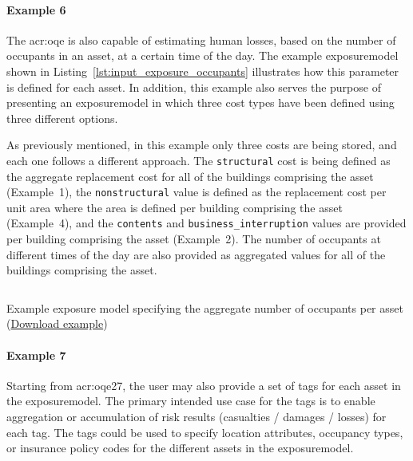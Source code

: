 \paragraph{Example 6}

The \glsdesc{acr:oqe} is also capable of estimating human losses, based on the
number of occupants in an \gls{asset}, at a certain time of the day. The example
\gls{exposuremodel} shown in Listing~\ref{lst:input_exposure_occupants} illustrates
how this parameter is defined for each \gls{asset}. In addition, this example also
serves the purpose of presenting an \gls{exposuremodel} in which three cost
types have been defined using three different options.

As previously mentioned, in this example only three costs are being stored,
and each one follows a different approach. The \Verb+structural+ cost is being
defined as the aggregate replacement cost for all of the buildings comprising
the asset (Example~1), the \Verb+nonstructural+ value is defined as the
replacement cost per unit area where the area is defined per building
comprising the \gls{asset} (Example~4), and the \Verb+contents+ and
\Verb+business_interruption+ values are provided per building comprising the
\gls{asset} (Example~2). The number of occupants at different times of the day are
also provided as aggregated values for all of the buildings comprising the
\gls{asset}.

\begin{listing}[htbp]
  \inputminted[firstline=1,firstnumber=1,fontsize=\footnotesize,frame=single,linenos,bgcolor=lightgray]{xml}{oqum/risk/verbatim/input_exposure_occupants.xml}
  \caption{Example exposure model specifying the aggregate number of occupants per asset (\href{https://raw.githubusercontent.com/GEMScienceTools/oq-engine-docs/master/oqum/risk/verbatim/input_exposure_occupants.xml}{Download example})}
  \label{lst:input_exposure_occupants}
\end{listing}


\paragraph{Example 7}

Starting from \glsdesc{acr:oqe27}, the user may also provide a set of \glspl{tag} 
for each \gls{asset} in the \gls{exposuremodel}. The primary intended use case for the 
\glspl{tag} is to enable aggregation or accumulation of risk results (casualties /
damages / losses) for each \gls{tag}. The \glspl{tag} could be used to specify
location attributes, occupancy types, or insurance policy codes for the 
different \glspl{asset} in the \gls{exposuremodel}.

